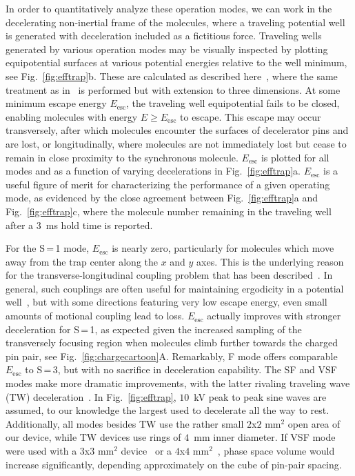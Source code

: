 \documentclass[%
 reprint,
 amsmath,amssymb,
 aps,
prl,
]{revtex4-1}
\begin{document}
In order to quantitatively analyze these operation modes, we can work in the decelerating non-inertial frame of the molecules, where a traveling potential well is generated with deceleration included as a fictitious force. 
Traveling wells generated by various operation modes may be visually inspected by plotting equipotential surfaces at various potential energies relative to the well minimum, see Fig.~\ref{fig:efftrap}b.
These are calculated as described here~\cite{ssm}, where the same treatment as in~\cite{Bethlem2000,Hudson2004} is performed but with extension to three dimensions.
At some minimum escape energy $E_\text{esc}$, the traveling well equipotential fails to be closed, enabling molecules with energy $E\ge E_\text{esc}$ to escape. 
This escape may occur transversely, after which molecules encounter the surfaces of decelerator pins and are lost, or longitudinally, where molecules are not immediately lost but cease to remain in close proximity to the synchronous molecule.
$E_\text{esc}$ is plotted for all modes and as a function of varying decelerations in Fig.~\ref{fig:efftrap}a.
$E_\text{esc}$ is a useful figure of merit for characterizing the performance of a given operating mode, as evidenced by the close agreement between Fig.~\ref{fig:efftrap}a and Fig.~\ref{fig:efftrap}c, where the molecule number remaining in the traveling well after a $3$~ms hold time is reported.

For the S\,=\,1 mode, $E_\text{esc}$ is nearly zero, particularly for molecules which move away from the trap center along the $x$ and $y$ axes. 
This is the underlying reason for the transverse-longitudinal coupling problem that has been described~\cite{VanDeMeerakker2006}.
In general, such couplings are often useful for maintaining ergodicity in a potential well~\cite{Surkov1996}, but with some directions featuring very low escape energy, even small amounts of motional coupling lead to loss.
$E_\text{esc}$ actually improves with stronger deceleration for S\,=\,1, as expected given the increased sampling of the transversely focusing region when molecules climb further towards the charged pin pair, see Fig.~\ref{fig:chargecartoon}A.
Remarkably, F mode offers comparable $E_\text{esc}$ to S\,=\,3, but with no sacrifice in deceleration capability.
The SF and VSF modes make more dramatic improvements, with the latter rivaling traveling wave (TW) deceleration~\cite{Osterwalder2010}. 
In Fig.~\ref{fig:efftrap}, $10$~kV peak to peak sine waves are assumed, to our knowledge the largest used to decelerate all the way to rest.
Additionally, all modes besides TW use the rather small $2$x$2\text{ mm}^2$ open area of our device, while TW devices use rings of $4$~mm inner diameter.
If VSF mode were used with a $3$x$3\text{ mm}^2$ device~\cite{Scharfenberg2009} or a $4$x$4\text{ mm}^2$~\cite{VandeMeerakker2005}, phase space volume would increase significantly, depending approximately on the cube of pin-pair spacing. 
\end{document}
